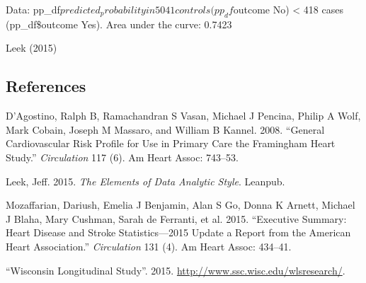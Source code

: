 \documentclass[11pt,]{article}
\begin{document}
Data: pp\_df\(predicted_probability in 5041 controls (pp_df\)outcome No)
\textless{} 418 cases (pp\_df\$outcome Yes). Area under the curve:
0.7423

Leek (2015)

\subsection*{References}\label{references}

D'Agostino, Ralph B, Ramachandran S Vasan, Michael J Pencina, Philip A
Wolf, Mark Cobain, Joseph M Massaro, and William B Kannel. 2008.
``General Cardiovascular Risk Profile for Use in Primary Care the
Framingham Heart Study.'' \emph{Circulation} 117 (6). Am Heart Assoc:
743--53.

Leek, Jeff. 2015. \emph{The Elements of Data Analytic Style}. Leanpub.

Mozaffarian, Dariush, Emelia J Benjamin, Alan S Go, Donna K Arnett,
Michael J Blaha, Mary Cushman, Sarah de Ferranti, et al. 2015.
``Executive Summary: Heart Disease and Stroke Statistics---2015 Update a
Report from the American Heart Association.'' \emph{Circulation} 131
(4). Am Heart Assoc: 434--41.

``Wisconsin Longitudinal Study''. 2015.
\url{http://www.ssc.wisc.edu/wlsresearch/}.
\end{document}
